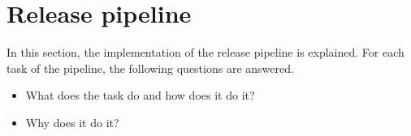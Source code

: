 \section{Release pipeline}\label{sec:release-pipeline}

In this section, the implementation of the release pipeline is explained.
For each task of the pipeline, the following questions are answered.

\begin{itemize}
    \item What does the task do and how does it do it?
    \item Why does it do it?
\end{itemize}



